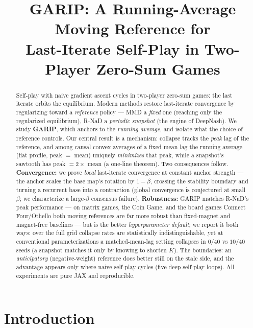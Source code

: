 \documentclass[10pt,twocolumn]{article}
\title{\textbf{GARIP: A Running-Average Moving Reference for\\
Last-Iterate Self-Play in Two-Player Zero-Sum Games}}
\author{}
\date{}
\theoremstyle{plain}
\theoremstyle{remark}
\begin{document}
\maketitle

\begin{abstract}
Self-play with naive gradient ascent cycles in two-player zero-sum games: the last
iterate orbits the equilibrium. Modern methods restore last-iterate convergence by
regularizing toward a \emph{reference} policy --- MMD a \emph{fixed} one (reaching
only the regularized equilibrium), R-NaD a \emph{periodic snapshot} (the engine of
DeepNash). We study \textbf{GARIP}, which anchors to the \emph{running average}, and
isolate what the choice of reference controls. Our central result is a mechanism:
collapse tracks the \emph{peak} lag of the reference, and among causal convex averages
of a fixed mean lag the running average (flat profile, peak $=$ mean) uniquely
\emph{minimizes} that peak, while a snapshot's sawtooth has peak $=2\times$ mean (a
one-line theorem). Two consequences follow. \textbf{Convergence:} we prove
\emph{local} last-iterate convergence at constant anchor strength --- the anchor
scales the base map's rotation by $1-\beta$, crossing the stability boundary and
turning a recurrent base into a contraction (global convergence is conjectured at small
$\beta$; we characterize a large-$\beta$ consensus failure).
\textbf{Robustness:} GARIP matches R-NaD's peak performance --- on matrix games, the
Coin Game, and the board games Connect Four/Othello both moving references are far
more robust than fixed-magnet and magnet-free baselines --- but is the better
\emph{hyperparameter default}; we report it both ways: over the full grid collapse
rates are statistically indistinguishable, yet at conventional parameterizations a
matched-mean-lag setting collapses in $0/40$ vs $10/40$ seeds (a snapshot matches it
only by knowing to shorten $K$). The boundaries: an \emph{anticipatory}
(negative-weight) reference does better still on the stale side, and the advantage
appears only where naive self-play cycles (five deep self-play loops). All experiments
are pure JAX and reproducible.
\end{abstract}

\section{Introduction}
\end{document}
